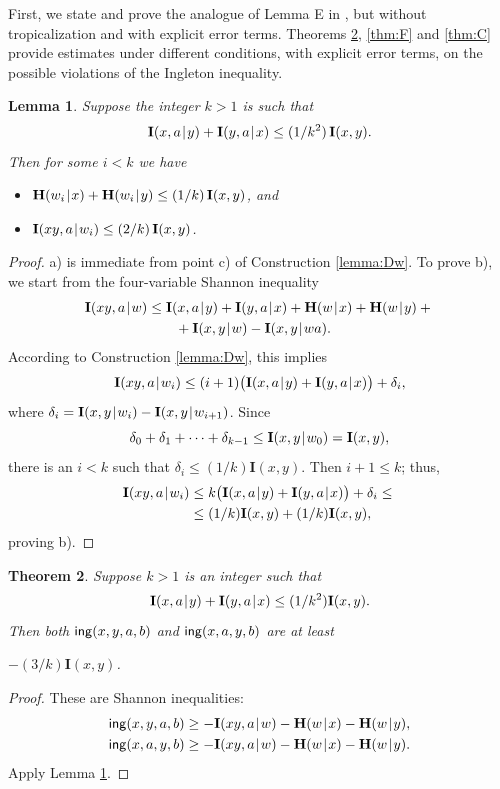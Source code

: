 \documentclass[a4paper]{IEEEtran}
\def\|{\mskip1.5mu{|}\mskip1.5mu}
\def\H{\mathbf H}
\def\I{\mathbf I}
\def\ing[#1,#2,#3,#4]{\mathsf{ing}(#1,#2,#3,#4\mkern 0mu)}
\newtheorem{theorem}{Theorem}
\newtheorem{lemma}[theorem]{Lemma}
\theoremstyle{definition}
\begin{document}
First, we state and prove the analogue of Lemma E in \cite{rom3}, but
without tropicalization and with explicit error terms. Theorems
\ref{thm:AB}, \ref{thm:F} and \ref{thm:C} provide estimates under different
conditions, with explicit error terms, on the possible violations of the
Ingleton inequality.

\begin{lemma}\label{corr:E}
Suppose the integer $k>1$ is such that
$$
  \I(x,a\|y)+\I(y,a\|x)\le (1/k^2)\,\I(x,y).
$$
Then for some $i<k$ we have
\begin{itemize}
\item[a)] $\H(w_i\|x)+\H(w_i\|y) \le (1/k)\,\I(x,y)$, and
\item[b)] $\I(xy,a\|w_i)\le (2/k)\,\I(x,y)$.
\end{itemize}
\end{lemma}
\begin{proof}
a) is immediate from point c) of Construction \ref{lemma:Dw}. To prove b), we start
from the four-variable Shannon inequality
\begin{align*}
  \I(xy,a\|w) &\le \I(x,a\|y)+\I(y,a\|x)+\H(w\|x)+\H(w\|y) + {}\\
              & ~~~~~~{} + \I(x,y\|w)-\I(x,y\|wa).
\end{align*}
According to Construction \ref{lemma:Dw}, this implies
$$
   \I(xy,a\|w_i)\le (i+1)\big(\I(x,a\|y)+\I(y,a\|x)\big ) +
   \delta_i,
$$
where $\delta_i=\I(x,y\|w_i)-\I(x,y\|w_{i+1})$. Since
$$
    \delta_0+\delta_1+\cdots+\delta_{k-1}\le 
    \I(x,y\|w_0)=\I(x,y),
$$
there is an $i< k$ such that $\delta_i\le (1/k)\I(x,y)$. Then $i+1\le
k$; thus,
\begin{align*}
  \I(xy,a\|w_i) &\le k\big(\I(x,a\|y)+\I(y,a\|x)\big ) +
        \delta_i \le{} \\
   &\le (1/k)\I(x,y) + (1/k)\I(x,y),
\end{align*}
proving b).
\end{proof}

\begin{theorem}\label{thm:AB}
Suppose $k>1$ is an integer such that
$$
   \I(x,a\|y)+\I(y,a\|x) \le (1/k^2)\I(x,y).
$$
Then both $\ing[x,y,a,b]$ and $\ing[x,a,y,b]$ are at least

$-(3/k)\I(x,y)$.
\end{theorem}
\begin{proof}
These are Shannon inequalities:
\begin{align*}
   \ing[x,y,a,b] &\ge -\I(xy,a\|w)-\H(w\|x)-\H(w\|y), \\
   \ing[x,a,y,b] &\ge -\I(xy,a\|w)-\H(w\|x)-\H(w\|y).
\end{align*}
Apply Lemma \ref{corr:E}.
\end{proof}
\end{document}
